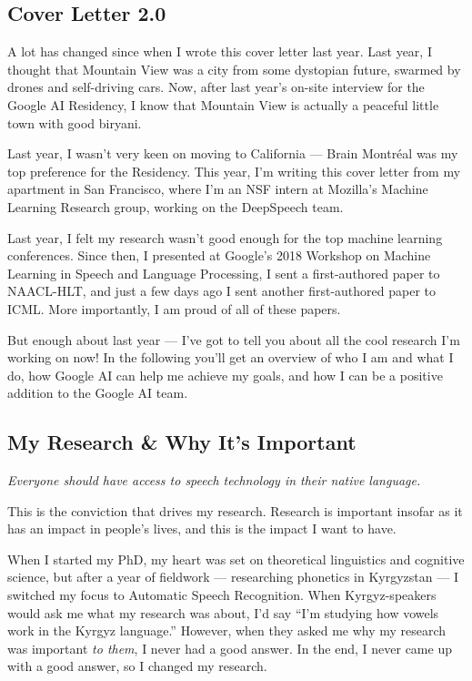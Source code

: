 \documentclass[12pt,a4paper]{article}
\begin{document}
\subsection*{Cover Letter 2.0}


A lot has changed since when I wrote this cover letter last year. Last year, I thought that Mountain View was a city from some dystopian future, swarmed by drones and self-driving cars. Now, after last year's on-site interview for the Google AI Residency, I know that Mountain View is actually a peaceful little town with good biryani.

Last year, I wasn't very keen on moving to California --- Brain Montr\'eal was my top preference for the Residency. This year, I'm writing this cover letter from my apartment in San Francisco, where I'm an NSF intern at Mozilla's Machine Learning Research group, working on the DeepSpeech team.

Last year, I felt my research wasn't good enough for the top machine learning conferences. Since then, I presented at Google's 2018 Workshop on Machine Learning in Speech and Language Processing, I sent a first-authored paper to NAACL-HLT, and just a few days ago I sent another first-authored paper to ICML. More importantly, I am proud of all of these papers.

But enough about last year --- I've got to tell you about all the cool research I'm working on now! In the following you'll get an overview of who I am and what I do, how Google AI can help me achieve my goals, and how I can be a positive addition to the Google AI team.




\subsection*{My Research \& Why It's Important}

\begin{center}
\textit{Everyone should have access to speech technology in their native language.}
\end{center}

This is the conviction that drives my research. Research is important insofar as it has an impact in people's lives, and this is the impact I want to have.

When I started my PhD, my heart was set on theoretical linguistics and cognitive science, but after a year of fieldwork --- researching phonetics in Kyrgyzstan --- I switched my focus to Automatic Speech Recognition. When Kyrgyz-speakers would ask me what my research was about, I'd say ``I'm studying how vowels work in the Kyrgyz language.'' However, when they asked me why my research was important \textit{to them}, I never had a good answer. In the end, I never came up with a good answer, so I changed my research.
\end{document}
